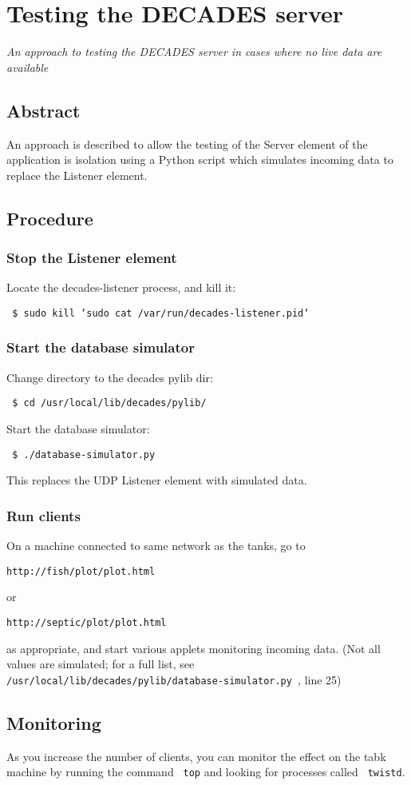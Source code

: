 

\chapter{Testing the DECADES server}
\begin{center}
{\small\em An approach to testing the DECADES server in cases where no live data are available}
\end{center}

\section{Abstract}
An approach is described to allow the testing of the Server element of the application is isolation using a Python script
which simulates incoming data to replace the Listener element.

\section{Procedure}
\subsection{Stop the Listener element} 
Locate the decades-listener process, and kill it: 

\texttt{ \$ sudo kill `sudo cat /var/run/decades-listener.pid`}

\subsection{Start the database simulator}
Change directory to the decades pylib dir:

\texttt{ \$ cd /usr/local/lib/decades/pylib/}

Start the database simulator:

\texttt{ \$ ./database-simulator.py }

This replaces the UDP Listener element with simulated data.

\subsection{Run clients}
On a machine connected to same network as the tanks, go to

\texttt{http://fish/plot/plot.html} 

or

\texttt{http://septic/plot/plot.html}

as appropriate, and start various applets monitoring incoming data. (Not all values are simulated; for a full list, see \texttt{ /usr/local/lib/decades/pylib/database-simulator.py }, line 25)

\section{Monitoring}
As you increase the number of clients, you can monitor the effect on the tabk machine by running the command \texttt{ top} and looking for processes called \texttt{ twistd}.

\newpage
